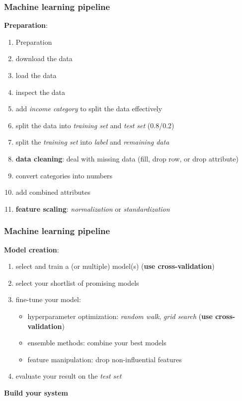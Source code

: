 \documentclass[aspectratio=169]{beamer}
\begin{document}
	\begin{frame}
		\frametitle{Machine learning pipeline}
		\textbf{Preparation}:
		\begin{enumerate}
			\item Preparation
			\item download the data
			\item load the data
			\item inspect the data
			\item add \textit{income category} to split the data effectively
			\item split the data into \textit{training set} and \textit{test set} (0.8/0.2)
			\item split the \textit{training set} into \textit{label} and \textit{remaining data}
			\item \textbf{data cleaning}: deal with missing data (fill, drop row, or drop attribute)
			\item convert categories into numbers
			\item add combined attributes
			\item \textbf{feature scaling}: \textit{normalization} or \textit{standardization}
		\end{enumerate}
	\end{frame}

	\begin{frame}
		\frametitle{Machine learning pipeline}
		\textbf{Model creation}:
		\begin{enumerate}
			\item select and train a (or multiple) model(s) (\textbf{use cross-validation})
			\item select your shortlist of promising models
			\item fine-tune your model: 
			\begin{itemize}
				\item hyperparameter optimization: \textit{random walk}, \textit{grid search} (\textbf{use cross-validation})
				\item ensemble methods: combine your best models
				\item feature manipulation: drop non-influential features
			\end{itemize}
			\item evaluate your result on the \textit{test set}
		\end{enumerate}
		\textbf{Build your system}
	\end{frame}
\end{document}
